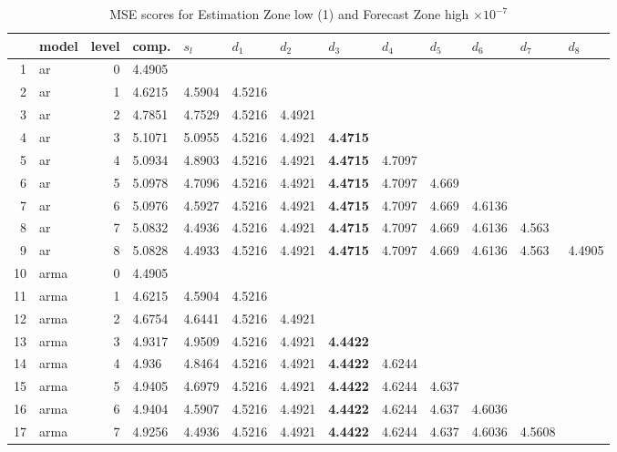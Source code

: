 \documentclass[10pt,a4paper]{article}
\begin{document}
\begin{table}[ht]
\centering
\caption{MSE scores for Estimation Zone low (1) and Forecast Zone high $ \times 10^{-7}$} 
\begin{tabular}{rlrllllllllll}
  \hline
 & model & level & comp. & $s_l$ & $d_1$ & $d_2$ & $d_3$ & $d_4$ & $d_5$ & $d_6$ & $d_7$ & $d_8$ \\ 
  \hline
1 & ar &     0 & 4.4905 &  &  &  &  &  &  &  &  &  \\ 
  2 & ar &     1 & 4.6215 & 4.5904 & 4.5216 &  &  &  &  &  &  &  \\ 
  3 & ar &     2 & 4.7851 & 4.7529 & 4.5216 & 4.4921 &  &  &  &  &  &  \\ 
  4 & ar &     3 & 5.1071 & 5.0955 & 4.5216 & 4.4921 & \textbf{4.4715} &  &  &  &  &  \\ 
  5 & ar &     4 & 5.0934 & 4.8903 & 4.5216 & 4.4921 & \textbf{4.4715} & 4.7097 &  &  &  &  \\ 
  6 & ar &     5 & 5.0978 & 4.7096 & 4.5216 & 4.4921 & \textbf{4.4715} & 4.7097 & 4.669 &  &  &  \\ 
  7 & ar &     6 & 5.0976 & 4.5927 & 4.5216 & 4.4921 & \textbf{4.4715} & 4.7097 & 4.669 & 4.6136 &  &  \\ 
  8 & ar &     7 & 5.0832 & 4.4936 & 4.5216 & 4.4921 & \textbf{4.4715} & 4.7097 & 4.669 & 4.6136 & 4.563 &  \\ 
  9 & ar &     8 & 5.0828 & 4.4933 & 4.5216 & 4.4921 & \textbf{4.4715} & 4.7097 & 4.669 & 4.6136 & 4.563 & 4.4905 \\ 
   \hline
10 & arma &     0 & 4.4905 &  &  &  &  &  &  &  &  &  \\ 
  11 & arma &     1 & 4.6215 & 4.5904 & 4.5216 &  &  &  &  &  &  &  \\ 
  12 & arma &     2 & 4.6754 & 4.6441 & 4.5216 & 4.4921 &  &  &  &  &  &  \\ 
  13 & arma &     3 & 4.9317 & 4.9509 & 4.5216 & 4.4921 & \textbf{4.4422} &  &  &  &  &  \\ 
  14 & arma &     4 & 4.936 & 4.8464 & 4.5216 & 4.4921 & \textbf{4.4422} & 4.6244 &  &  &  &  \\ 
  15 & arma &     5 & 4.9405 & 4.6979 & 4.5216 & 4.4921 & \textbf{4.4422} & 4.6244 & 4.637 &  &  &  \\ 
  16 & arma &     6 & 4.9404 & 4.5907 & 4.5216 & 4.4921 & \textbf{4.4422} & 4.6244 & 4.637 & 4.6036 &  &  \\ 
  17 & arma &     7 & 4.9256 & 4.4936 & 4.5216 & 4.4921 & \textbf{4.4422} & 4.6244 & 4.637 & 4.6036 & 4.5608 &  \\ 

\end{tabular}
\end{table}
\end{document}
